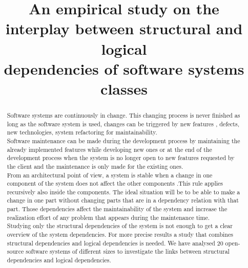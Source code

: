 \documentclass[conference,compsoc]{IEEEtran}
\begin{document}
\title{An empirical study on the interplay between structural and logical\\ dependencies of software systems classes 
}


\author{
\and
{}
}

\maketitle

\begin{abstract}
Software systems are continuously in change. This changing process is never finished as long as the software system is used, changes can be triggered by new features , defects, new technologies, system refactoring for maintainability.\\ Software maintenance can be made during the development process by maintaining the already implemented features while developing new ones or at the end of the development process when the system is no longer open to new features requested by the client and the maintenance is only made for the existing ones. \\From an architectural point of view, a system is stable when a change in one component of the system does not affect the other components .This rule applies recursively also inside the components. The ideal situation will be to be able to make a change in one part without changing parts that are in a dependency relation with that part. Those dependencies affect the maintainability of the system and increase the realization effort of any problem that appears during the maintenance time.\\Studying only the structural dependencies of the system is not enough to get a clear overview of the system dependencies. For more precise results a study that combines structural dependencies and logical dependencies is needed. We have analysed 20 open-source software systems of different sizes to investigate the links between structural dependencies and logical dependencies.
\end{abstract}

\IEEEpeerreviewmaketitle
\end{document}
